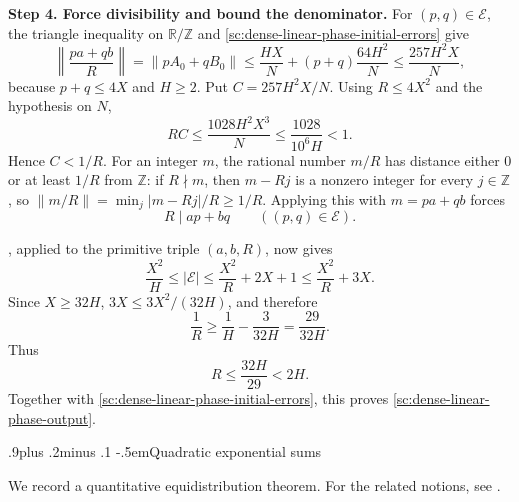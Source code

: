 \documentclass[twoside]{aomart}
\makeatletter
\theoremstyle{paperplain}
\theoremstyle{paperdefinition}
\renewcommand\subsection{\@startsection{subsection}{2}{\z@}
  {.9\baselineskip plus .2\baselineskip minus .1\baselineskip}
  {-.5em}{\normalfont\bfseries}}
\renewenvironment{proof}[1][\proofname]{\par\pushQED{\qed}%
  \normalfont\topsep6\p@\@plus3\p@\relax\trivlist
  \item[\hskip\labelsep\itshape #1\@addpunct{.}]\ignorespaces
}{\popQED\endtrivlist\@endpefalse}
\numberwithin{equation}{section}
\makeatother
\begin{document}
\begin{proof}
\medskip
\noindent\textbf{Step 4. Force divisibility and bound the denominator.}
For $(p,q)\in\mathcal E$, the triangle inequality on
$\mathbb R/\mathbb Z$ and \eqref{sc:dense-linear-phase-initial-errors}
give
\[
 \left\|\frac{pa+qb}{R}\right\|
 =\|pA_0+qB_0\|
 \le\frac{HX}{N}+(p+q)\frac{64H^2}{N}
 \le\frac{257H^2X}{N},
\]
because $p+q\le4X$ and $H\ge2$.  Put
$C=257H^2X/N$.  Using $R\le4X^2$ and the hypothesis on $N$,
\[
 RC\le\frac{1028H^2X^3}{N}
 \le\frac{1028}{10^6H}<1.
\]
Hence $C<1/R$.  For an integer $m$, the rational number $m/R$ has
distance either $0$ or at least $1/R$ from $\mathbb Z$: if $R\nmid m$,
then $m-Rj$ is a nonzero integer for every $j\in\mathbb Z$, so
$\|m/R\|=\min_j|m-Rj|/R\ge1/R$.  Applying this with $m=pa+qb$ forces
\[
 R\mid ap+bq\qquad((p,q)\in\mathcal E).
\]

, applied to the primitive triple $(a,b,R)$, now gives
\[
 \frac{X^2}{H}
 \le|\mathcal E|
 \le\frac{X^2}{R}+2X+1
 \le\frac{X^2}{R}+3X.
\]
Since $X\ge32H$,
$3X\le3X^2/(32H)$, and therefore
\[
 \frac1R\ge\frac1H-\frac3{32H}
 =\frac{29}{32H}.
\]
Thus
\[
 R\le\frac{32H}{29}<2H.
\]
Together with \eqref{sc:dense-linear-phase-initial-errors}, this proves
\eqref{sc:dense-linear-phase-output}.
\end{proof}

\subsection{Quadratic exponential sums}

We record a quantitative equidistribution theorem. For the related notions,
see \cite{LSS}.
\end{document}

